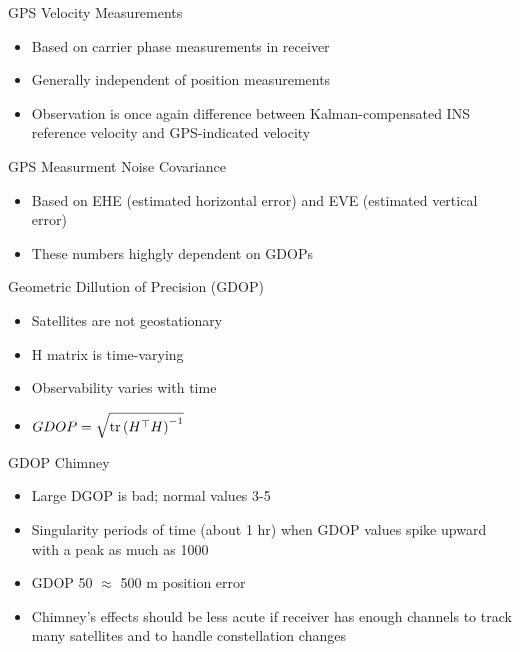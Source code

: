 \begin{frame}
GPS Velocity Measurements
\begin{itemize}
  \item Based on carrier phase measurements in receiver
  \item Generally independent of position measurements
  \item Observation is once again difference between Kalman-compensated INS reference velocity and GPS-indicated velocity
\end{itemize} 
\end{frame}

\begin{frame}
GPS Measurment Noise Covariance
\begin{itemize}
  \item Based on EHE (estimated horizontal error) and EVE (estimated vertical error)
  \item These numbers highgly dependent on GDOPs
\end{itemize} 
\end{frame}

\begin{frame}
Geometric Dillution of Precision (GDOP)
\begin{itemize}
  \item Satellites are not geostationary
  \item H matrix is time-varying
  \item Observability varies with time
  \item $GDOP=\sqrt{\text{tr}\left(H^\top H\right)^{-1}}$
\end{itemize} 
\end{frame}


\begin{frame}
GDOP Chimney
\begin{itemize}
  \item Large DGOP is bad; normal values 3-5
  \item Singularity periods of time (about 1 hr) when GDOP values spike upward with a peak as much as 1000
  \item GDOP 50 $\approx$ 500 m position error
  \item Chimney's effects should be less acute if receiver has enough channels to track many satellites and to handle constellation changes
\end{itemize} 
\end{frame}

